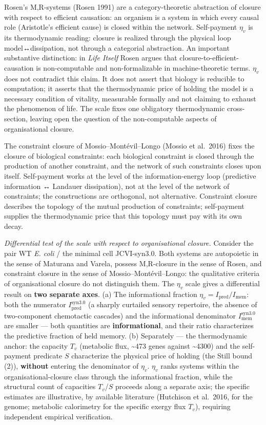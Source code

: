 \documentclass[pdflatex,sn-mathphys-ay]{sn-jnl}
\begin{document}
Rosen's M,R-systems (Rosen 1991) are a category-theoretic abstraction of closure with respect to efficient causation: an organism is a system in which every causal role (Aristotle's efficient cause) is closed within the network. Self-payment \(\eta_v\) is its thermodynamic reading: closure is realized through the physical loop model↔dissipation, not through a categorial abstraction. An important substantive distinction: in \emph{Life Itself} Rosen argues that closure-to-efficient-causation is non-computable and non-formalizable in machine-theoretic terms. \(\eta_v\) does not contradict this claim. It does not assert that biology is reducible to computation; it asserts that the thermodynamic price of holding the model is a necessary condition of vitality, measurable formally and not claiming to exhaust the phenomenon of life. The scale fixes one obligatory thermodynamic cross-section, leaving open the question of the non-computable aspects of organisational closure.

The constraint closure of Mossio--Montévil--Longo (Mossio et al.~2016) fixes the closure of biological constraints: each biological constraint is closed through the production of another constraint, and the network of such constraints closes upon itself. Self-payment works at the level of the information-energy loop (predictive information ↔ Landauer dissipation), not at the level of the network of constraints; the constructions are orthogonal, not alternative. Constraint closure describes the topology of the mutual production of constraints; self-payment supplies the thermodynamic price that this topology must pay with its own decay.

\emph{Differential test of the scale with respect to organisational closure.} Consider the pair WT \emph{E. coli} / the minimal cell JCVI-syn3.0. Both systems are autopoietic in the sense of Maturana and Varela, possess M,R-closure in the sense of Rosen, and constraint closure in the sense of Mossio--Montévil--Longo: the qualitative criteria of organisational closure do not distinguish them. The \(\eta_v\) scale gives a differential result on \textbf{two separate axes}. (a) The informational fraction \(\eta_v = I_{\text{pred}}/I_{\text{mem}}\): both the numerator \(I_{\text{pred}}^{\text{syn3.0}}\) (a sharply curtailed sensory repertoire, the absence of two-component chemotactic cascades) and the informational denominator \(I_{\text{mem}}^{\text{syn3.0}}\) are smaller --- both quantities are \textbf{informational}, and their ratio characterizes the predictive fraction of held memory. (b) Separately --- the thermodynamic anchor: the capacity \(T_v\) (metabolic flux, \textasciitilde473 genes against \textasciitilde4300) and the self-payment predicate \(S\) characterize the physical price of holding (the Still bound (2)), \textbf{without} entering the denominator of \(\eta_v\). \(\eta_v\) ranks systems within the organisational-closure class through the informational fraction, while the structural count of capacities \(T_v\)/\(S\) proceeds along a separate axis; the specific estimates are illustrative, by available literature (Hutchison et al.~2016, for the genome; metabolic calorimetry for the specific exergy flux \(T_v\)), requiring independent empirical verification.
\end{document}
